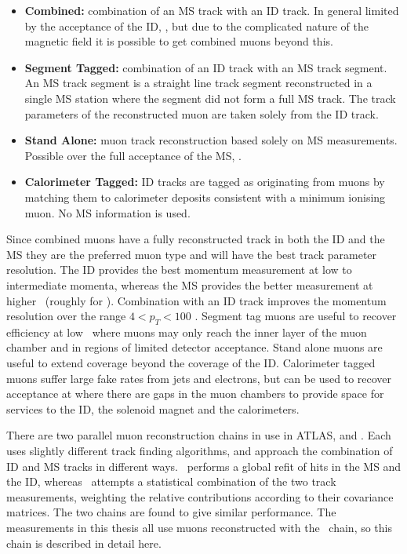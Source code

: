 \begin{itemize}

    \item {\bf Combined:} combination of an MS track with an ID track. In
    general limited by the acceptance of the ID, , but due to the complicated
    nature of the magnetic field it is possible to get combined muons beyond
    this.

    \item {\bf Segment Tagged:} combination of an ID track with an MS track
    segment. An MS track segment is a straight line track segment reconstructed
    in a single MS station where the segment did not form a full MS track. The
    track parameters of the reconstructed muon are taken solely from the ID
    track.

    \item {\bf Stand Alone:} muon track reconstruction based solely on 
    MS measurements. Possible over the full acceptance of the MS,
    .

    \item {\bf Calorimeter Tagged:} ID tracks are tagged as originating from
    muons by matching them to calorimeter deposits consistent with a minimum ionising
    muon. No MS information is used.


\end{itemize}

Since combined muons have a fully reconstructed track in both the ID and the MS
they are the preferred muon type and will have the best track parameter
resolution. The ID provides the best momentum measurement at low to intermediate
momenta, whereas the MS provides the better measurement at higher \pt\ (roughly
for ). Combination with an ID track improves the momentum resolution
over the range $4 < p_{T} < 100$ \GeV. Segment tag muons are useful to recover
efficiency at low \pt\ where muons may only reach the inner layer of the muon
chamber and in regions of limited detector acceptance. Stand alone muons are
useful to extend coverage beyond the coverage of the ID. Calorimeter tagged
muons suffer large fake rates from jets and electrons, but can be used to recover
acceptance at  where there are gaps in the muon chambers to
provide space for services to the ID, the solenoid magnet and the calorimeters.

There are two parallel muon reconstruction chains in use in ATLAS,
\staco\cite{1742-6596-219-3-032052} and
\muid. Each uses slightly different track finding algorithms, and approach the
combination of ID and MS tracks in different ways. \muid\ performs a global
refit of hits in the MS and the ID, whereas \staco\ attempts a statistical
combination of the two track measurements, weighting the relative contributions
according to their covariance matrices. The two chains are found to give similar
performance. The measurements in this thesis all use muons
reconstructed with the \staco\ chain, so this chain is described in detail here.

